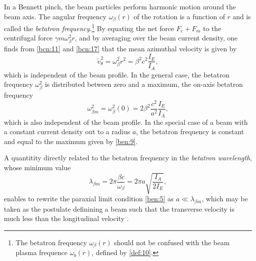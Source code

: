 \documentclass [12pt,a4paper,     ]{report} %
\newcommand{\CON}{\overline}          %
\begin{document}
	In a Bennett pinch, the beam particles perform harmonic motion around the beam axis.  The angular frequency $\omega_\beta(r)$ of the rotation is a function of $r$ and is called the \emph{betatron frequency}.\footnote{The betatron frequency $\omega_\beta(r)$ should not be confused with the beam plasma frequence $\omega_b(r)$, defined by \eqref{def:10}.} By equating the net force $F_e+F_m$ to the centrifugal force $\gamma m \omega_\beta^2 r$, and by averaging over the beam current density, one finds from \eqref{bcn:11} and \eqref{bcn:17} that the mean azimuthal velocity is given by
%
\begin{equation}\label{ben:8} %
 \tilde{v}_{\theta}^2  = \CON{\omega_\beta^2 r^2} = \beta^2 c^2 \frac{I_E}{I_A},
\end{equation}
%
which is independent of the beam profile.  In the general case, the betatron frequency  $\omega_\beta^2$ is distributed between zero and a maximum, the on-axis betatron frequency
%
\begin{equation}\label{ben:9} %
      \omega_{\beta m}^2 = \omega_\beta^2(0)
                         = 2\beta^2\frac{c^2}{a^2}\frac{I_E}{I_A},
\end{equation}
%
which is also independent of the beam profile.  In the special case of a beam with a constant current density out to a radius $a$, the betatron frequency is constant and equal to the maximum given by \eqref{ben:9}.

A quantitity directly related to the betatron frequency in the \emph{betatron wavelength}, whose minimum value
%
\begin{equation}\label{ben:20} %
      \lambda_{\beta m} = 2 \pi \frac{\beta c}{\omega_\beta}
                        = 2 \pi a \sqrt{ \frac{I_A}{2I_E} },
\end{equation}
%
enables to rewrite the paraxial limit condition \eqref{ben:5} as $a \ll \lambda_{\beta m}$, which may be taken as the postulate definining a beam such that the transverse velocity is much less than the longitudinal velocity \cite{LAWSO1958-}.
\end{document}
